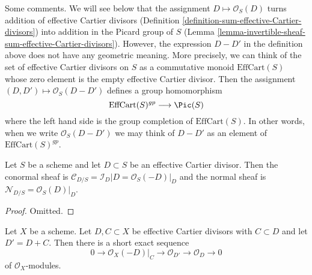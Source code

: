\noindent
Some comments. We will see below that the assignment
$D \mapsto \mathcal{O}_S(D)$ turns addition of effective Cartier
divisors (Definition \ref{definition-sum-effective-Cartier-divisors})
into addition in the Picard group of $S$
(Lemma \ref{lemma-invertible-sheaf-sum-effective-Cartier-divisors}).
However, the expression $D - D'$ in the definition above does not
have any geometric meaning. More precisely, we can think of the
set of effective Cartier divisors on $S$ as a commutative monoid
$\text{EffCart}(S)$ whose zero element is the empty effective Cartier divisor.
Then the assignment $(D, D') \mapsto \mathcal{O}_S(D - D')$ defines
a group homomorphism
$$
\text{EffCart}(S)^{gp} \longrightarrow \Pic(S)
$$
where the left hand side is the group completion of
$\text{EffCart}(S)$. In other words, when we write $\mathcal{O}_S(D - D')$
we may think of $D - D'$ as an element of $\text{EffCart}(S)^{gp}$.

\begin{lemma}
\label{lemma-conormal-effective-Cartier-divisor}
Let $S$ be a scheme and let $D \subset S$ be an effective Cartier divisor.
Then the conormal sheaf is $\mathcal{C}_{D/S} = \mathcal{I}_D|D =
\mathcal{O}_S(-D)|_D$ and the normal sheaf is
$\mathcal{N}_{D/S} = \mathcal{O}_S(D)|_D$.
\end{lemma}

\begin{proof}
Omitted.
\end{proof}

\begin{lemma}
\label{lemma-ses-add-divisor}
Let $X$ be a scheme. Let $D, C \subset X$ be
effective Cartier divisors with $C \subset D$ and let $D' = D + C$.
Then there is a short exact sequence
$$
0 \to \mathcal{O}_X(-D)|_C \to \mathcal{O}_{D'} \to \mathcal{O}_D \to 0
$$
of $\mathcal{O}_X$-modules.
\end{lemma}

